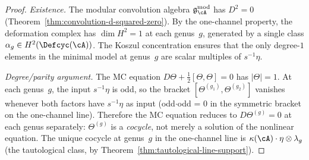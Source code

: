 \begin{proof}
\emph{Existence.}
The modular convolution algebra
$\mathfrak{g}_{\cA}^{\mathrm{mod}}$ has $D^2 = 0$
(Theorem~\ref{thm:convolution-d-squared-zero}).
By the one-channel property, the deformation complex has
$\dim H^2 = 1$ at each genus~$g$, generated by a single class
$\alpha_g \in H^2(\Defcyc(\cA))$.
The Koszul concentration ensures that the only degree-$1$
elements in the minimal model at genus~$g$ are scalar multiples of
$s^{-1}\eta$.

\emph{Degree/parity argument.}
The MC equation
$D\Theta + \tfrac12[\Theta,\Theta] = 0$
has $|\Theta| = 1$.  At each genus~$g$, the input $s^{-1}\eta$ is
odd, so the bracket $[\Theta^{(g_1)},\Theta^{(g_2)}]$ vanishes
whenever both factors have $s^{-1}\eta$ as input (odd$\cdot$odd = 0
in the symmetric bracket on the one-channel line).  Therefore the
MC equation reduces to
$D\Theta^{(g)} = 0$
at each genus separately: $\Theta^{(g)}$ is a \emph{cocycle},
not merely a solution of the nonlinear equation.
The unique cocycle at genus~$g$ in the one-channel line is
$\kappa(\cA) \cdot \eta \otimes \lambda_g$
(the tautological class, by
Theorem~\ref{thm:tautological-line-support}).
\end{proof}

